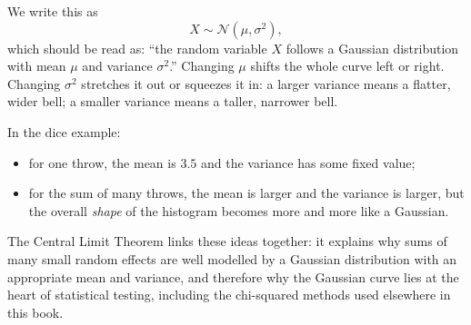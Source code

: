 We write this as
\[
  X \sim \mathcal{N}(\mu, \sigma^2),
\]
which should be read as: ``the random variable \(X\) follows a Gaussian distribution with mean \(\mu\) and variance \(\sigma^2\).''  Changing \(\mu\) shifts the whole curve left or right.  Changing \(\sigma^2\) stretches it out or squeezes it in: a larger variance means a flatter, wider bell; a smaller variance means a taller, narrower bell.

In the dice example:
\begin{itemize}
  \item for one throw, the mean is \(3.5\) and the variance has some fixed value;
  \item for the sum of many throws, the mean is larger and the variance is larger, but the overall \emph{shape} of the histogram becomes more and more like a Gaussian.
\end{itemize}

The Central Limit Theorem links these ideas together: it explains why sums of many small random effects are well modelled by a Gaussian distribution with an appropriate mean and variance, and therefore why the Gaussian curve lies at the heart of statistical testing, including the chi-squared methods used elsewhere in this book.

